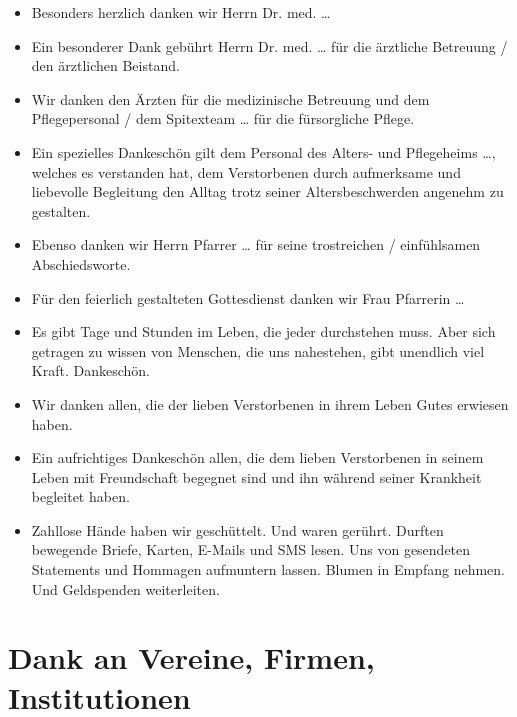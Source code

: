 \documentclass[ngerman,a4paper,11pt]{scrreprt}
\begin{document}
\begin{itemize}
\item Besonders herzlich danken wir Herrn Dr. med. \ldots{}
\item Ein besonderer Dank gebührt Herrn Dr. med. \ldots{} für die ärztliche Betreuung
/ den ärztlichen Beistand.
\item Wir danken den Ärzten für die medizinische Betreuung und dem Pflegepersonal
/ dem Spitexteam \ldots{}  für die fürsorgliche Pflege.
\item Ein spezielles Dankeschön gilt dem Personal des Alters- und Pflegeheims
\ldots{}, welches es verstanden hat, dem Verstorbenen durch aufmerksame und
liebevolle Begleitung den Alltag trotz seiner Altersbeschwerden angenehm zu
gestalten.
\item Ebenso danken wir Herrn Pfarrer \ldots{} für seine trostreichen / einfühlsamen
Abschiedsworte.
\item Für den feierlich gestalteten Gottesdienst danken wir Frau Pfarrerin \ldots{}
\item Es gibt Tage und Stunden im Leben, die jeder durchstehen muss. Aber sich
getragen zu wissen von Menschen, die uns nahestehen, gibt unendlich viel
Kraft. Dankeschön.
\item Wir danken allen, die der lieben Verstorbenen in ihrem Leben Gutes erwiesen
haben.
\item Ein aufrichtiges Dankeschön allen, die dem lieben Verstorbenen in seinem
Leben mit Freundschaft begegnet sind und ihn während seiner Krankheit
begleitet haben.
\item Zahllose Hände haben wir geschüttelt. Und waren gerührt. Durften bewegende
Briefe, Karten, E-Mails und SMS lesen. Uns von gesendeten Statements und
Hommagen aufmuntern lassen. Blumen in Empfang nehmen. Und Geldspenden
weiterleiten.
\end{itemize}

\section{Dank an Vereine, Firmen, Institutionen}
\label{sec-2-1-7}
\end{document}
